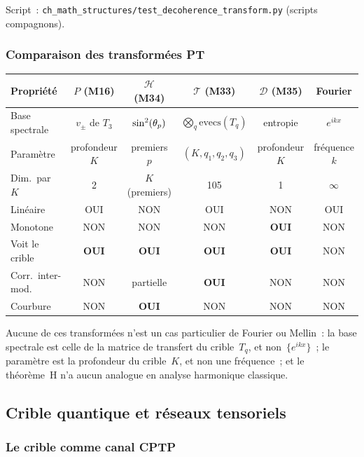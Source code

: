 \documentclass[12pt,a4paper]{article}
\begin{document}
Script~:
\texttt{ch\_math\_structures/test\_decoherence\_transform.py}
(scripts compagnons).


\subsubsection{Comparaison des transformées PT}

\begin{center}
\small
\begin{tabular}{lccccc}
\toprule
\textbf{Propriété} & $P$ (M16) & $\mathcal{H}$ (M34) &
  $\mathcal{T}$ (M33) & $\mathcal{D}$ (M35) & Fourier \\
\midrule
Base spectrale & $v_\pm$ de $T_3$ & $\sin^2(\theta_{p})$ &
  $\bigotimes_q \mathrm{evecs}(T_q)$ & entropie & $e^{ikx}$ \\
Paramètre & profondeur $K$ & premiers $p$ & $(K,q_1,q_2,q_3)$ &
  profondeur $K$ & fréquence $k$ \\
Dim.\ par $K$ & 2 & $K$ (premiers) & 105 & 1 & $\infty$ \\
Linéaire & OUI & NON & OUI & NON & OUI \\
Monotone & NON & NON & NON & \textbf{OUI} & NON \\
Voit le crible & \textbf{OUI} & \textbf{OUI} & \textbf{OUI} &
  \textbf{OUI} & NON \\
Corr.\ inter-mod. & NON & partielle & \textbf{OUI} & NON & NON \\
Courbure & NON & \textbf{OUI} & NON & NON & NON \\
\bottomrule
\end{tabular}
\end{center}

Aucune de ces transformées n'est un cas particulier de Fourier ou
Mellin~: la base spectrale est celle de la matrice de transfert du
crible~$T_q$, et non~$\{e^{ikx}\}$~; le paramètre est la profondeur
du crible~$K$, et non une fréquence~; et le théorème~H n'a aucun
analogue en analyse harmonique classique.


\subsection{Crible quantique et réseaux tensoriels}
\label{sec:ms_quantum}

\subsubsection{Le crible comme canal CPTP}
\end{document}
